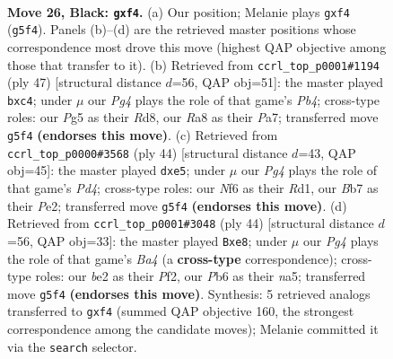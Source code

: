 \documentclass[11pt]{article}
\begin{document}
\clearpage

\begin{figure}[p]\centering
\begin{subfigure}{0.46\textwidth}\centering
\resizebox{\linewidth}{!}{%
\newchessgame
\chessboard[
  setfen={r5k1/pbpp4/1p3n1p/5pp1/2P2P2/NP4P1/P2PBK1P/R7 b - - 0 26},
  showmover=false,
  pgfstyle=straightmove, color=movearrow, markmove={g5-f4}
]}
\caption{}
\end{subfigure}\hfill
\begin{subfigure}{0.46\textwidth}\centering
\resizebox{\linewidth}{!}{%
\newchessgame
\chessboard[
  setfen={3r1k2/p4p1p/4n1p1/1p1N4/2Pp4/1P4P1/P3PPKP/5R2 b - - 0 24},
  showmover=false,
  pgfstyle=straightmove, color=movearrow, markmove={b5-c4}
]}
\caption{}
\end{subfigure}
\\[4pt]
\begin{subfigure}{0.46\textwidth}\centering
\resizebox{\linewidth}{!}{%
\newchessgame
\chessboard[
  setfen={2b1r1k1/6p1/p1pp1p1p/P3p3/3P4/2N2PP1/4P2P/3R2K1 w - - 0 23},
  showmover=false,
  pgfstyle=straightmove, color=movearrow, markmove={d4-e5}
]}
\caption{}
\end{subfigure}\hfill
\begin{subfigure}{0.46\textwidth}\centering
\resizebox{\linewidth}{!}{%
\newchessgame
\chessboard[
  setfen={3rbk2/1p2pp1p/p5p1/n1P5/B5P1/2P1PN2/P4P1P/1R4K1 w - - 1 23},
  showmover=false,
  pgfstyle=straightmove, color=movearrow, markmove={a4-e8}
]}
\caption{}
\end{subfigure}
\caption{\textbf{Move 26, Black: \texttt{gxf4}.} (a) Our position; Melanie plays \texttt{gxf4} (\texttt{g5f4}). Panels (b)--(d) are the retrieved master positions whose correspondence most drove this move (highest QAP objective among those that transfer to it). (b) Retrieved from \texttt{ccrl\_top\_p0001\#1194} (ply 47) [structural distance $d$=56, QAP obj=51]: the master played \texttt{bxc4}; under $\mu$ our \emph{Pg4} plays the role of that game's \emph{Pb4}; cross-type roles: our \emph{P}g5 as their \emph{R}d8, our \emph{R}a8 as their \emph{P}a7; transferred move \texttt{g5f4} \textbf{(endorses this move)}. (c) Retrieved from \texttt{ccrl\_top\_p0000\#3568} (ply 44) [structural distance $d$=43, QAP obj=45]: the master played \texttt{dxe5}; under $\mu$ our \emph{Pg4} plays the role of that game's \emph{Pd4}; cross-type roles: our \emph{N}f6 as their \emph{R}d1, our \emph{B}b7 as their \emph{P}e2; transferred move \texttt{g5f4} \textbf{(endorses this move)}. (d) Retrieved from \texttt{ccrl\_top\_p0001\#3048} (ply 44) [structural distance $d$=56, QAP obj=33]: the master played \texttt{Bxe8}; under $\mu$ our \emph{Pg4} plays the role of that game's \emph{Ba4} (a \textbf{cross-type} correspondence); cross-type roles: our \emph{b}e2 as their \emph{P}f2, our \emph{P}b6 as their \emph{n}a5; transferred move \texttt{g5f4} \textbf{(endorses this move)}. Synthesis: 5 retrieved analogs transferred to \texttt{gxf4} (summed QAP objective 160, the strongest correspondence among the candidate moves); Melanie committed it via the \texttt{search} selector.}
\label{fig:thought-m51}
\end{figure}
\end{document}
